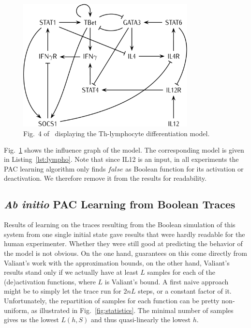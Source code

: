 \documentclass{llncs}
\begin{document}
\begin{figure}[htbp]
   \centering
   \includegraphics[width=0.8\textwidth]{th_net_clean.png}
   \caption{Fig.~4 of~\cite{RRMTC06tcsb} displaying the Th-lymphocyte
   differentiation model.\label{fig:lympho}}
\end{figure}

Fig.~\ref{fig:lympho} shows the influence graph of the model. The
corresponding model is given in Listing~\ref{lst:lympho}.
Note that since IL12 is an input, in all experiments the PAC learning
algorithm only finds $false$ as Boolean function for its activation or
deactivation. We therefore remove it from the results for readability.

\begin{listfig}[htb]
   
   \caption{Influence system for the lymphocyte differentiation of
   example~\ref{ex:lympho}.}\label{lst:lympho}
\end{listfig}

\subsection{\emph{Ab initio} PAC Learning from Boolean Traces}
\label{sec:abinitio}

Results of learning on the traces resulting from the Boolean simulation of
this system from one single initial state gave results that were hardly
readable for the human experimenter. Whether they were still good at
predicting the behavior of the model is not obvious. On the one hand,
guarantees on this come directly from Valiant's work with the approximation
bounds, on the other hand,  Valiant's results stand only if we actually have
at least $L$ samples for each of the (de)activation functions, where $L$ is
Valiant's bound. A first naive approach might be to simply let the trace run
for $2nL$ steps, or a constant factor of it. Unfortunately, the repartition of
samples for each function can be pretty non-uniform, as illustrated in
Fig.~\ref{fig:statistics}. The minimal number of samples gives us the lowest
$L(h, S)$ and thus quasi-linearly the lowest $h$.
\end{document}
